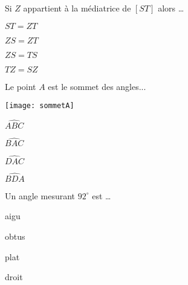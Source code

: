  
 \begin{QCM}
  \begin{GroupeQCM} 
     \begin{exercice}
     Si $Z$ appartient à la médiatrice de $[ST]$ alors \ldots
      \begin{ChoixQCM}{4}
      \item $ST = ZT$
      \item $ZS = ZT$
      \item $ZS = TS$
      \item $TZ = SZ$
      \end{ChoixQCM}
\begin{corrige}
   \end{corrige}
    \end{exercice}
    

     \begin{exercice}
     Le point $A$ est le sommet des angles... \vspace{-2em}\begin{center}\texttt{[image: sommetA]}\end{center}\vspace{-1em}
      \begin{ChoixQCM}{4}
      \item $\widehat{ABC}$
      \item $\widehat{BAC}$
      \item $\widehat{DAC}$
      \item $\widehat{BDA}$
      \end{ChoixQCM}
\begin{corrige}
   \end{corrige}
    \end{exercice}
    
    
     \begin{exercice}
     Un angle mesurant $92^\circ$ est \ldots
      \begin{ChoixQCM}{4}
      \item aigu
      \item obtus
      \item plat
      \item droit
      \end{ChoixQCM}
\begin{corrige}
   \end{corrige}
    \end{exercice}
    

\end{GroupeQCM}
\end{QCM}
